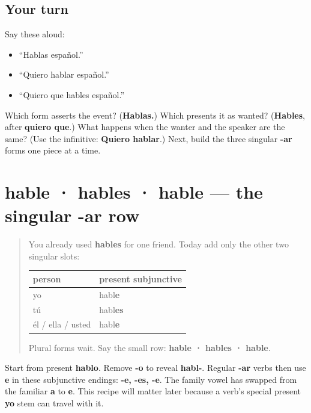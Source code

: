 \subsection*{Your turn}
Say these aloud:

\begin{itemize}
\raggedright
  \item “Hablas español.”
  \item “Quiero hablar español.”
  \item “Quiero que hables español.”
\end{itemize}

\begin{tcolorbox}[breakable,colback=teal!4,colframe=teal!35!black,title={Before you move on}]
Which form asserts the event? (\textbf{Hablas.}) Which presents it as wanted? (\textbf{Hables}, after \textbf{quiero que}.) What happens when the wanter and the speaker are the same? (Use the infinitive: \textbf{Quiero hablar}.) Next, build the three singular \textbf{-ar} forms one piece at a time.
\end{tcolorbox}
\section[hable · hables · hable]{hable · hables · hable — the singular -ar row}

\label{lesson:ES-C18-subjuntivo}



\begin{quote}
You already used \textbf{hables} for one friend. Today add only the other two singular slots:

\noindent
\begin{tabularx}{\linewidth}{@{}>{\raggedright\arraybackslash}X>{\raggedright\arraybackslash}X@{}}
\toprule
\textbf{person} & \textbf{present subjunctive} \\
\midrule
yo & habl\textbf{e} \\
tú & habl\textbf{es} \\
él / ella / usted & habl\textbf{e} \\
\bottomrule
\end{tabularx}

Plural forms wait. Say the small row: \textbf{hable · hables · hable}.
\end{quote}

\begin{grammarlens}[title={Grammar Lens: the yo stem, then a vowel swap}]
Start from present \textbf{hablo}. Remove \textbf{-o} to reveal \textbf{habl-}. Regular \textbf{-ar} verbs then use \textbf{e} in these subjunctive endings: \textbf{-e, -es, -e}. The family vowel has swapped from the familiar \textbf{a} to \textbf{e}. This recipe will matter later because a verb's special present \textbf{yo} stem can travel with it.
\end{grammarlens}

